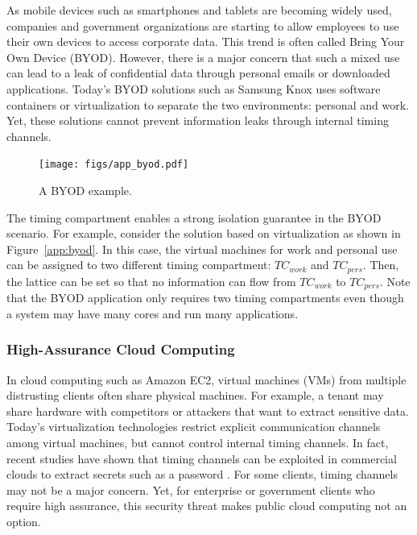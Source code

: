 As mobile devices such as smartphones and tablets are becoming widely used, 
companies and government organizations are starting to allow employees to
use their own devices to access corporate data. This trend is often called
Bring Your Own Device (BYOD). However, there is a major concern that such a
mixed use can lead to a leak of confidential data through personal emails or
downloaded applications. Today's BYOD solutions such as Samsung Knox uses
software containers or virtualization to separate the two environments:
personal and work. Yet, these solutions cannot prevent information leaks
through internal timing channels.

\begin{figure}
    \begin{center}
        \texttt{[image: figs/app\_byod.pdf]}
        \caption{A BYOD example.}
        \label{fig:app_byod}
    \end{center}
\end{figure}

The timing compartment enables a strong isolation guarantee in the BYOD
scenario. For example, consider the solution based on virtualization as 
shown in Figure~\ref{app:byod}. In this case, the virtual machines for
work and personal use can be assigned to two different timing compartment:
$TC_{work}$ and $TC_{pers}$. Then, the lattice can be set so that no
information can flow from $TC_{work}$ to $TC_{pers}$.
Note that the BYOD application only requires two timing compartments even
though a system may have many cores and run many applications.

\subsubsection{High-Assurance Cloud Computing}

In cloud computing such as Amazon EC2, virtual machines (VMs) from multiple
distrusting clients often share physical machines. 
For example, a tenant may share hardware with competitors or attackers that 
want to extract sensitive data. Today's virtualization technologies restrict 
explicit communication channels among virtual machines, but cannot control 
internal timing channels. In fact, recent studies have shown that timing channels
can be exploited in commercial clouds to extract secrets such as 
a password \cite{FIXME}.
For some clients, timing channels may not be a major concern. Yet, for enterprise
or government clients who require high assurance, this security threat makes
public cloud computing not an option. 

